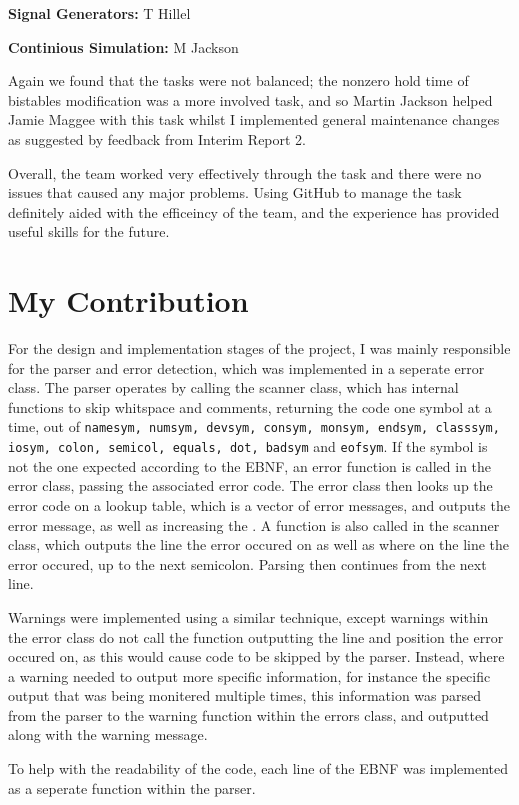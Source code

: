 \documentclass[a4paper,10pt]{article}
\begin{document}
\textbf{Signal Generators:} T Hillel

\textbf{Continious Simulation:} M Jackson

Again we found that the tasks were not balanced; the nonzero hold time of bistables modification was a more involved task, and so Martin Jackson helped Jamie Maggee with this task whilst I implemented general maintenance changes as suggested by feedback from Interim Report 2.

Overall, the team worked very effectively through the task and there were no issues that caused any major problems. Using GitHub to manage the task definitely aided with the efficeincy of the team, and the experience has provided useful skills for the future.

\section{My Contribution}

For the design and implementation stages of the project, I was mainly responsible for the parser and error detection, which was implemented in a seperate error class. The parser operates by calling the scanner class, which has internal functions to skip whitspace and comments, returning the code one symbol at a time, out of \texttt{namesym, numsym, devsym, consym, monsym, endsym, classsym, iosym, colon, semicol, equals, dot, badsym} and \texttt{eofsym}. If the symbol is not the one expected according to the EBNF, an error function is called in the error class, passing the associated error code. The error class then looks up the error code on a lookup table, which is a vector of error messages, and outputs the error message, as well as increasing the . A function is also called in the scanner class, which outputs the line the error occured on as well as where on the line the error occured, up to the next semicolon. Parsing then continues from the next line.

Warnings were implemented using a similar technique, except warnings within the error class do not call the function outputting the line and position the error occured on, as this would cause code to be skipped by the parser. Instead, where a warning needed to output more specific information, for instance the specific output that was being monitered multiple times, this information was parsed from the parser to the warning function within the errors class, and outputted along with the warning message.

To help with the readability of the code, each line of the EBNF was implemented as a seperate function within the parser.
\end{document}
